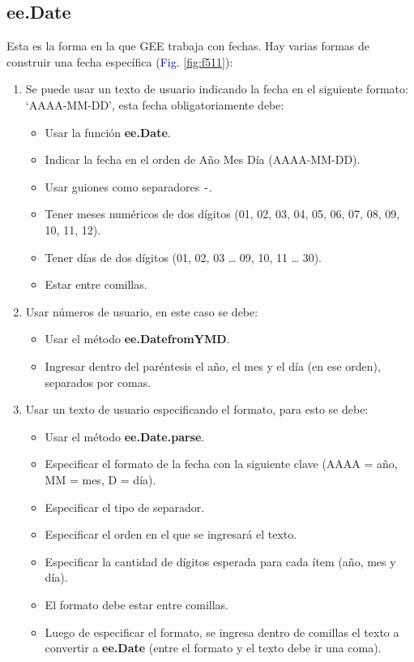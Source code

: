 \documentclass[
  12pt,
  letterpaper,
  twoside]{book}
\providecommand{\tightlist}{%
  \setlength{\itemsep}{0pt}\setlength{\parskip}{0pt}}
\newcommand\boldpurple[1]{\textcolor{darkpurple}{\textbf{#1}}}
\begin{document}
\hypertarget{ee.date}{%
\subsection*{ee.Date}\label{ee.date}}

Esta es la forma en la que GEE trabaja con fechas. Hay varias formas de construir una fecha específica (\textcolor{darkblue}{Fig.} \ref{fig:f511}):

\begin{enumerate}
\def\labelenumi{\arabic{enumi}.}
\tightlist
\item
  Se puede usar un texto de usuario indicando la fecha en el siguiente formato: `AAAA-MM-DD', esta fecha obligatoriamente debe:

  \begin{itemize}
  \tightlist
  \item
    Usar la función \boldpurple{ee.Date}.
  \item
    Indicar la fecha en el orden de Año Mes Día (AAAA-MM-DD).
  \item
    Usar guiones como separadores \texttt{-}.
  \item
    Tener meses numéricos de dos dígitos (01, 02, 03, 04, 05, 06, 07, 08, 09, 10, 11, 12).
  \item
    Tener días de dos dígitos (01, 02, 03 \ldots{} 09, 10, 11 \ldots{} 30).
  \item
    Estar entre comillas.
  \end{itemize}
\item
  Usar números de usuario, en este caso se debe:

  \begin{itemize}
  \tightlist
  \item
    Usar el método \boldpurple{ee.DatefromYMD}.
  \item
    Ingresar dentro del paréntesis el año, el mes y el día (en ese orden), separados por comas.
  \end{itemize}
\item
  Usar un texto de usuario especificando el formato, para esto se debe:

  \begin{itemize}
  \tightlist
  \item
    Usar el método \boldpurple{ee.Date.parse}.
  \item
    Especificar el formato de la fecha con la siguiente clave (AAAA = año, MM = mes, D = día).
  \item
    Especificar el tipo de separador.
  \item
    Especificar el orden en el que se ingresará el texto.
  \item
    Especificar la cantidad de dígitos esperada para cada ítem (año, mes y día).
  \item
    El formato debe estar entre comillas.
  \item
    Luego de especificar el formato, se ingresa dentro de comillas el texto a convertir a \boldpurple{ee.Date} (entre el formato y el texto debe ir una coma).
  \end{itemize}
\end{enumerate}
\end{document}
